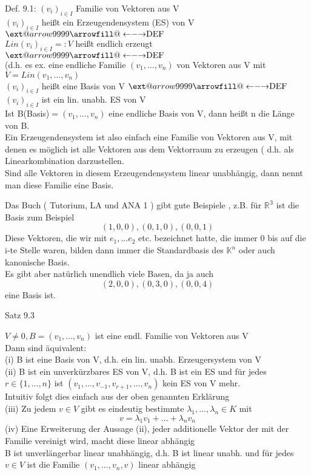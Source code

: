 \documentclass[headsepline,12pt,a4paper]{scrartcl}
\makeatletter
\newcommand\xleftrightarrow[2][]{%
  \ext@arrow 9999{\longleftrightarrowfill@}{#1}{#2}}
\newcommand\longleftrightarrowfill@{%
  \arrowfill@\leftarrow\relbar\rightarrow}
\makeatother
\begin{document}
\item[Def. 9.1:] 
$(v_i)_{i \in I}$ Familie von Vektoren aus V \\
$(v_i)_{i \in I}$ heißt ein Erzeugendensystem (ES) von V  $\xleftrightarrow{\text{DEF}}$ \\
$\textit{Lin}(v_i)_{i \in I}=: V $ heißt endlich erzeugt $\xleftrightarrow{\text{DEF}}$ \\
(d.h. es ex. eine endliche Familie $(v_1,...,v_n)$ von Vektoren aus V mit $V =\textit{Lin}(v_1,...,v_n)$ \\

$(v_i)_{i \in I}$ heißt eine Basis von V $\xleftrightarrow{\text{DEF}}$ $(v_i)_{i \in I}$ ist ein lin. unabh. ES von V  \\

Ist B(Basis)$= (v_1,...,v_n) $ eine endliche Basis von V, dann heißt n die Länge von B.  \\

Ein Erzeugendensystem ist also einfach eine Familie von Vektoren aus V, mit denen es möglich ist alle Vektoren aus dem Vektorraum zu erzeugen ( d.h. als Linearkombination darzustellen. \\
Sind alle Vektoren in diesem Erzeugendensystem linear unabhängig, dann nennt man diese Familie eine Basis. \\

\item Das Buch ( Tutorium, LA und ANA 1 ) gibt gute Beispiele , z.B. für $\mathbb{R^3}$ ist die Basis zum Beispiel 
$$ (1,0,0), (0,1,0), (0,0,1) $$ 
Diese Vektoren, die wir mit $e_1,...e_2 $ etc. bezeichnet hatte, die immer 0 bis auf die i-te Stelle waren, bilden dann immer die Standardbasis des $\mathbb{K}^n$ oder auch kanonische Basis. \\

Es gibt aber natürlich unendlich viele Basen, da ja auch 
$$ (2,0,0),(0,3,0),(0,0,4) $$ 
eine Basis ist. \\

\newpage

\item[Satz 9.3]

$V \neq 0, B = (v_1,...,v_n)$ ist eine endl. Familie von Vektoren aus V \\
Dann sind äquivalent: \\
(i) B ist eine Basis von V, d.h. ein lin. unabh. Erzeugersystem von V \\
(ii) B ist ein unverkürzbares ES von V, d.h. B ist ein ES und für jedes $r \in \{1,...,n\}$ ist $(v_1,...,v_{-1},v_{r+1},...,v_n)$ kein ES von V mehr. \\
Intuitiv folgt dies einfach aus der oben genannten Erklärung \\
(iii) Zu jedem $v\in V$ gibt es eindeutig bestimmte $ \lambda_1, ..., \lambda_n \in K $ mit \\
$$ v = \lambda_1 v_1+...+ \lambda_n v_n $$
(iv) Eine Erweiterung der Aussage (ii), jeder additionelle Vektor der mit der Familie vereinigt wird, macht diese linear abhängig \\
B ist unverlängerbar linear unabhängig, d.h. B ist linear unabh. und für jedes $v\in V $ ist die Familie $(v_1,...,v_n, v )$ linear abhängig \\
\end{document}
